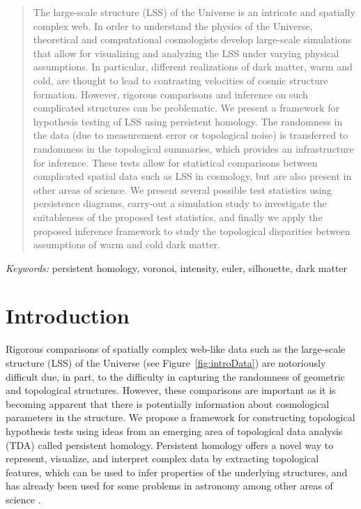 \documentclass[12pt]{article}
\newcommand{\figref}[1]{Figure~\ref{#1}}
\begin{document}
\bigskip
\begin{abstract}
The large-scale structure (LSS) of the Universe is an intricate and spatially complex web. In order to understand the physics of the Universe, theoretical and computational cosmologists develop large-scale simulations that allow for visualizing and analyzing the LSS under varying physical assumptions. In particular, different realizations of dark matter, warm and cold, are thought to lead to contrasting velocities of cosmic structure formation. However, rigorous comparisons and inference on such complicated structures can be problematic.  We present a framework for hypothesis testing of LSS using persistent homology. The randomness in the data (due to measurement error or topological noise) is transferred to randomness in the topological summaries, which provides an infrastructure for inference. These tests allow for statistical comparisons between complicated spatial data such as LSS in cosmology, but are also present in other areas of science. We present several possible test statistics using persistence diagrams, carry-out a simulation study to investigate the suitableness of the proposed test statistics, and finally we apply the proposed inference framework to study the topological disparities between assumptions of warm and cold dark matter.
\end{abstract}

\noindent%
{\it Keywords:} persistent homology, voronoi, intensity, euler, silhouette, dark matter
\vfill


\newpage
{} %
\section{Introduction}
\label{sec:intro}

Rigorous comparisons of spatially complex web-like data such as the large-scale structure (LSS) of the Universe (see \figref{fig:introData}) are notoriously difficult due, in part, to the difficulty in capturing the randomness of geometric and topological structures.  However, these comparisons are important as it is becoming apparent that there is potentially information about cosmological parameters in the structure. We propose a framework for constructing topological hypothesis tests using ideas from an emerging area of topological data analysis (TDA) called persistent homology. Persistent homology offers a novel way to represent, visualize, and interpret complex data by extracting topological features, which can be used to infer properties of the underlying structures, and has already been used for some problems in astronomy \citep{Sousbie2011, SousbieEtAl2011, van2011alpha,cisewski2014non} among other areas of science \citep{bendich2014persistent, duong2012closed}.
\end{document}
